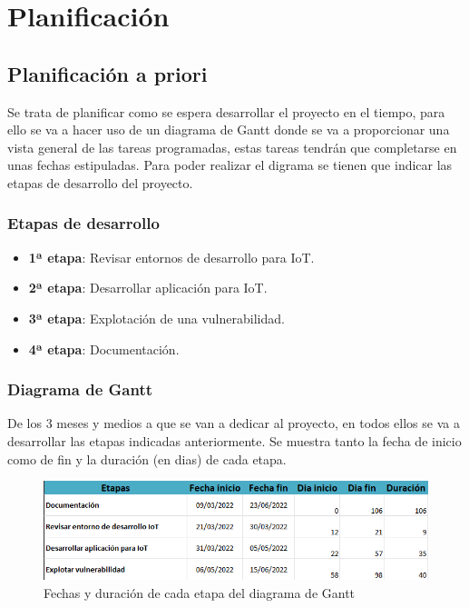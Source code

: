 \chapter{Planificación}

\section{Planificación a priori}

Se trata de planificar como se espera desarrollar el proyecto en el tiempo, para ello se va a hacer uso de un diagrama de Gantt donde se va a proporcionar una vista general de las tareas programadas, estas tareas tendrán que completarse en unas fechas estipuladas. Para poder realizar el digrama se tienen que indicar las etapas de desarrollo del proyecto.

\subsection{Etapas de desarrollo}

\begin{itemize}
    \item \textbf{1ª etapa}: Revisar entornos de desarrollo para IoT.
    \item \textbf{2ª etapa}: Desarrollar aplicación para IoT.
    \item \textbf{3ª etapa}: Explotación de una vulnerabilidad.
    \item \textbf{4ª etapa}: Documentación.
\end{itemize}

\subsection{Diagrama de Gantt}

De los 3 meses y medios a que se van a dedicar al proyecto, en todos ellos se va a desarrollar las etapas indicadas anteriormente. Se muestra tanto la fecha de inicio como de fin y la duración (en dias) de cada etapa.

\begin{figure}[p]
    \centering
    \includegraphics[width=\textwidth]{imagenes/gantt-1.png}
    \caption{Fechas y duración de cada etapa del diagrama de Gantt}
    \label{fig:figure1}
\end{figure}

